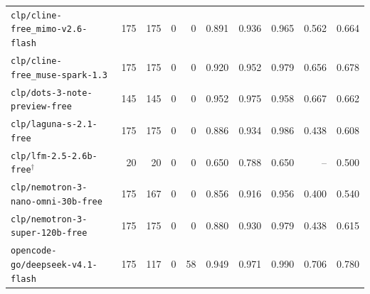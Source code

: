 \begin{table}[t]
{\begin{tabular}{lrrrrrrrrr}
\texttt{clp/cline-free\_mimo-v2.6-flash} & 175 & 175 & 0 & 0 & 0.891 & 0.936 & 0.965 & 0.562 & 0.664\\
\texttt{clp/cline-free\_muse-spark-1.3} & 175 & 175 & 0 & 0 & 0.920 & 0.952 & 0.979 & 0.656 & 0.678\\
\texttt{clp/dots-3-note-preview-free} & 145 & 145 & 0 & 0 & 0.952 & 0.975 & 0.958 & 0.667 & 0.662\\
\texttt{clp/laguna-s-2.1-free} & 175 & 175 & 0 & 0 & 0.886 & 0.934 & 0.986 & 0.438 & 0.608\\
\texttt{clp/lfm-2.5-2.6b-free}$^\dagger$ & 20 & 20 & 0 & 0 & 0.650 & 0.788 & 0.650 & -- & 0.500\\
\texttt{clp/nemotron-3-nano-omni-30b-free} & 175 & 167 & 0 & 0 & 0.856 & 0.916 & 0.956 & 0.400 & 0.540\\
\texttt{clp/nemotron-3-super-120b-free} & 175 & 175 & 0 & 0 & 0.880 & 0.930 & 0.979 & 0.438 & 0.615\\
\texttt{opencode-go/deepseek-v4.1-flash} & 175 & 117 & 0 & 58 & 0.949 & 0.971 & 0.990 & 0.706 & 0.780\\
\bottomrule\end{tabular}}\end{table}
